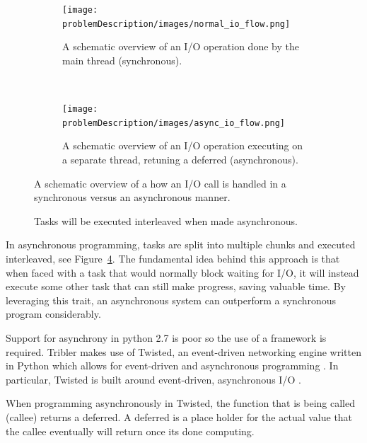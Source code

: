 \begin{figure}[h]
	\centering
	\begin{subfigure}[b]{\textwidth}
		\texttt{[image: problemDescription/images/normal\_io\_flow.png]}
		\caption{A schematic overview of an I/O operation done by the main thread (synchronous).}
		\label{fig:normal_io_flow}
	\end{subfigure}
	~ %
	\begin{subfigure}[b]{\textwidth}
		\texttt{[image: problemDescription/images/async\_io\_flow.png]}
		\caption{A schematic overview of an I/O operation executing on a separate thread, retuning a deferred (asynchronous).}
		\label{fig:async_io_flow}
	\end{subfigure}
	\caption{A schematic overview of a how an I/O call is handled in a synchronous versus an asynchronous manner.}
\end{figure}

\begin{figure}[h]
	\caption{Tasks will be executed interleaved when made asynchronous.}
	\label{fig:async_execution}
\end{figure}

In asynchronous programming, tasks are split into multiple chunks and executed interleaved, see Figure~\ref{fig:async_execution}.
The fundamental idea behind this approach is that when faced with a task that would normally block waiting for I/O, it will instead execute some other task that can still make progress, saving valuable time.
By leveraging this trait, an asynchronous system can outperform a synchronous program considerably.

Support for asynchrony in python 2.7 is poor so the use of a framework is required.
Tribler makes use of Twisted, an event-driven networking engine written in Python which allows for event-driven and asynchronous programming \cite{kinder2005event}.
In particular, Twisted is built around event-driven, asynchronous I/O \cite{lefkowitz2003network}.

When programming asynchronously in Twisted, the function that is being called (callee) returns a deferred.
A deferred is a place holder for the actual value that the callee eventually will return once its done computing.

